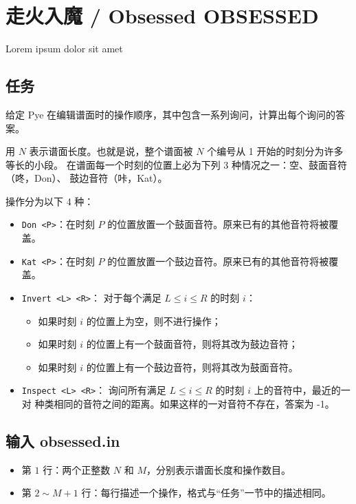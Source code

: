 \documentclass[UTF8, 11pt, a4paper]{article}
\begin{document}
\section*{走火入魔 / Obsessed \makebox[2.5em]{} \small{OBSESSED}}

Lorem ipsum dolor sit amet

\subsection*{任务}
给定 Pye 在编辑谱面时的操作顺序，其中包含一系列询问，计算出每个询问的答案。

用 $N$ 表示谱面长度。也就是说，整个谱面被 $N$ 个编号从 1 开始的时刻分为许多等长的小段。%
在谱面每一个时刻的位置上必为下列 3 种情况之一：空、鼓面音符（咚，Don）、%
鼓边音符（咔，Kat）。

操作分为以下 4 种：
\begin{itemize}
    \item \texttt{Don <P>}：在时刻 $P$ 的位置放置一个鼓面音符。原来已有的其他音符将被覆盖。
    \item \texttt{Kat <P>}：在时刻 $P$ 的位置放置一个鼓边音符。原来已有的其他音符将被覆盖。
    \item \texttt{Invert <L> <R>}：%
        对于每个满足 $L \leq i \leq R$ 的时刻 $i$：
        \begin{itemize}
            \item 如果时刻 $i$ 的位置上为空，则不进行操作；
            \item 如果时刻 $i$ 的位置上有一个鼓面音符，则将其改为鼓边音符；
            \item 如果时刻 $i$ 的位置上有一个鼓边音符，则将其改为鼓面音符。
        \end{itemize}
    \item \texttt{Inspect <L> <R>}：%
        询问所有满足 $L \leq i \leq R$ 的时刻 $i$ 上的音符中，最近的一对%
        种类相同的音符之间的距离。如果这样的一对音符不存在，答案为 -1。
\end{itemize}

\subsection*{输入 \makebox[0.5em]{} \small{obsessed.in}}
\begin{itemize}
    \item 第 $1$ 行：两个正整数 $N$ 和 $M$，分别表示谱面长度和操作数目。
    \item 第 $2 \sim M + 1$ 行：每行描述一个操作，格式与“任务”一节中的描述相同。
\end{itemize}
\end{document}
